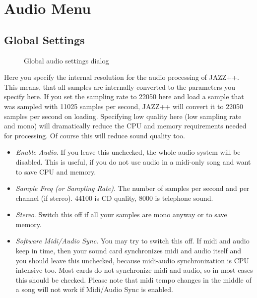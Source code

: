 \documentclass[letterpaper]{report}
\begin{document}
\section{Audio Menu}

\subsection{Global Settings}\label{globalsettings}

\begin{figure}
\caption{Global audio settings dialog}
\end{figure}

Here you specify the internal resolution for the audio processing of
JAZZ++.  This means, that all samples are internally converted to the
parameters you specify here. If you set the sampling rate to 22050 here
and load a sample that was sampled with 11025 samples per second, JAZZ++
will convert it to 22050 samples per second on loading. Specifying
low quality here (low sampling rate and mono) will dramatically reduce
the CPU and memory requirements needed for processing. Of course this
will reduce sound quality too.

\begin{itemize}

\item {\em Enable Audio}. If you leave this unchecked, the whole audio system
will be disabled. This is useful, if you do not use audio in a midi-only
song and want to save CPU and memory.

\item {\em Sample Freq (or Sampling Rate)}. The number of samples per second and
per channel (if stereo). 44100 is CD quality, 8000 is telephone sound.

\item {\em Stereo}. Switch this off if all your samples are mono anyway or to
save memory.

\item {\em Software Midi/Audio Sync}. You may try to switch this off. If midi
and audio keep in time, then your sound card synchronizes midi and audio
itself and you should leave this unchecked, because midi-audio synchronization
is CPU intensive too. Most cards do not synchronize midi and audio, so
in most cases this should be checked. Please note that midi tempo changes
in the middle of a song will not work if Midi/Audio Sync is enabled.

\end{itemize}
\end{document}
